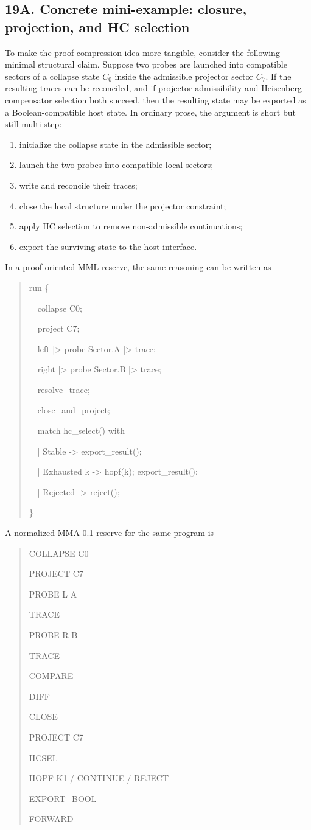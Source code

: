 \subsection*{19A. Concrete mini-example: closure, projection, and HC selection}
To make the proof-compression idea more tangible, consider the following minimal structural claim. Suppose two probes are launched into compatible sectors of a collapse state $C_0$ inside the admissible projector sector $C_7$. If the resulting traces can be reconciled, and if projector admissibility and Heisenberg-compensator selection both succeed, then the resulting state may be exported as a Boolean-compatible host state. In ordinary prose, the argument is short but still multi-step:
\begin{enumerate}[leftmargin=2em]
  \item initialize the collapse state in the admissible sector;
  \item launch the two probes into compatible local sectors;
  \item write and reconcile their traces;
  \item close the local structure under the projector constraint;
  \item apply HC selection to remove non-admissible continuations;
  \item export the surviving state to the host interface.
\end{enumerate}
In a proof-oriented MML reserve, the same reasoning can be written as
\begin{quote}
\ttfamily
run \{\par
\ \ collapse C0;\par
\ \ project C7;\par
\ \ left  |> probe Sector.A |> trace;\par
\ \ right |> probe Sector.B |> trace;\par
\ \ resolve\_trace;\par
\ \ close\_and\_project;\par
\ \ match hc\_select() with\par
\ \ | Stable      -> export\_result();\par
\ \ | Exhausted k -> hopf(k); export\_result();\par
\ \ | Rejected    -> reject();\par
\}\par
\end{quote}
A normalized MMA-0.1 reserve for the same program is
\begin{quote}
\ttfamily
COLLAPSE C0 \par
PROJECT C7 \par
PROBE L A \par
TRACE \par
PROBE R B \par
TRACE \par
COMPARE \par
DIFF \par
CLOSE \par
PROJECT C7 \par
HCSEL \par
HOPF K1 / CONTINUE / REJECT \par
EXPORT\_BOOL \par
FORWARD
\end{quote}
